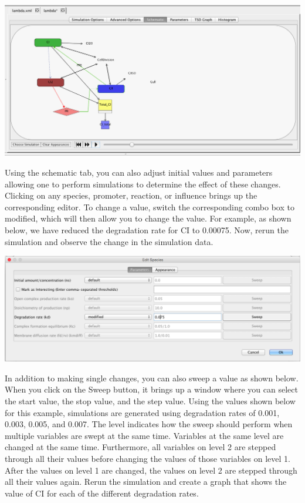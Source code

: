 \documentclass[titlepage,11pt]{article}
\begin{document}
\begin{center}
\includegraphics[width=160mm]{screenshots/movieView}
\end{center}

Using the schematic tab, you can also adjust initial values and parameters allowing one to perform simulations to determine the effect of these changes.  Clicking on any species, promoter, reaction, or influence brings up the corresponding editor.  To change a value, switch the corresponding combo box to modified, which will then allow you to change the value.  For example, as shown below, we have reduced the degradation rate for CI to 0.00075.  Now, rerun the simulation and observe the change in the simulation data.

\begin{center}
\includegraphics[width=160mm]{screenshots/paramEdit}
\end{center}

In addition to making single changes, you can also sweep a value as shown below.   When you click on the Sweep button, it brings up a window where you can select the start value, the stop value, and the step value.  Using the values shown below for this example, simulations are generated using degradation rates of 0.001, 0.003, 0.005, and 0.007.  The level indicates how the sweep should perform when multiple variables are swept at the same time.  Variables at the same level are changed at the same time.  Furthermore, all variables on level 2 are stepped through all their values before changing the values of those variables on level 1.  After the values on level 1 are changed, the values on level 2 are stepped through all their values again.  Rerun the simulation and create a graph that shows the value of CI for each of the different degradation rates.
\end{document}
